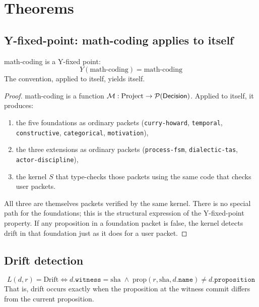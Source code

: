 
\section{Theorems}

\subsection{Y-fixed-point: math-coding applies to itself}

\begin{theorem}
math-coding is a Y-fixed point:
$$Y(\mathrm{math\text{-}coding}) = \mathrm{math\text{-}coding}$$
The convention, applied to itself, yields itself.
\end{theorem}

\begin{proof}
math-coding is a function $\mathcal{M} : \mathrm{Project} \to
\mathcal{P}(\mathsf{Decision})$. Applied to itself, it produces:
\begin{enumerate}
\item the five foundations as ordinary packets
      (\texttt{curry-howard}, \texttt{temporal}, \texttt{constructive},
      \texttt{categorical}, \texttt{motivation}),
\item the three extensions as ordinary packets
      (\texttt{process-fsm}, \texttt{dialectic-tas},
      \texttt{actor-discipline}),
\item the kernel $S$ that type-checks those packets using the same
      code that checks user packets.
\end{enumerate}
All three are themselves packets verified by the same kernel. There
is no special path for the foundations; this is the structural
expression of the Y-fixed-point property. If any proposition in a
foundation packet is false, the kernel detects drift in that
foundation just as it does for a user packet.
\end{proof}

\subsection{Drift detection}

\begin{theorem}
$$L(d, r) = \mathrm{Drift} \iff d.\mathtt{witness} = \text{sha} \;\wedge\; \mathrm{prop}(r, \text{sha}, d.\mathtt{name}) \neq d.\mathtt{proposition}$$
That is, drift occurs exactly when the proposition at the witness
commit differs from the current proposition.
\end{theorem}

